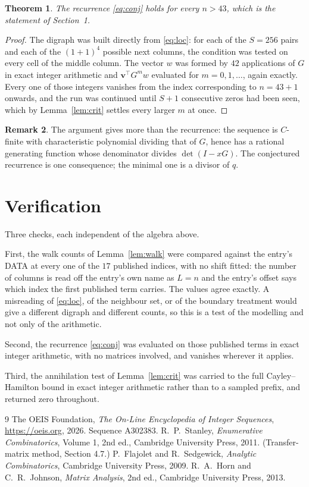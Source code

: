 \documentclass[11pt,a4paper]{article}
\theoremstyle{plain}
\newtheorem{theorem}{Theorem}
\theoremstyle{definition}
\newtheorem{remark}[theorem]{Remark}
\begin{document}
\begin{theorem}
The recurrence \eqref{eq:conj} holds for every $n>43$, which is the statement of
Section~1.
\end{theorem}

\begin{proof}
The digraph was built directly from \eqref{eq:loc}: for each of the $S=256$ pairs and each
of the $(1+1)^{4}$ possible next columns, the condition was tested on every cell of
the middle column. The vector $w$ was formed by $42$ applications of $G$ in exact integer
arithmetic and $\mathbf{v}^{\!\top}G^{m}w$ evaluated for $m=0,1,\dots$, again exactly.
Every one of those integers vanishes from the index corresponding to $n=43+1$ onwards,
and the run was continued until $S+1$ consecutive zeros had been seen, which by
Lemma~\ref{lem:crit} settles every larger $m$ at once.
\end{proof}

\begin{remark}
The argument gives more than the recurrence: the sequence is $C$-finite with characteristic
polynomial dividing that of $G$, hence has a rational generating function whose denominator
divides $\det(I-xG)$. The conjectured recurrence is one consequence; the minimal one is a
divisor of $q$.
\end{remark}

\section{Verification}

Three checks, each independent of the algebra above.

First, the walk counts of Lemma~\ref{lem:walk} were compared against the entry's DATA at
every one of the $17$ published indices, with no shift fitted: the number of columns is
read off the entry's own name as $L=n$ and the entry's offset says which index the first
published term carries. The values agree exactly. A misreading of \eqref{eq:loc}, of the
neighbour set, or of the boundary treatment would give a different digraph and different
counts, so this is a test of the modelling and not only of the arithmetic.

Second, the recurrence \eqref{eq:conj} was evaluated on those published terms in exact
integer arithmetic, with no matrices involved, and vanishes wherever it applies.

Third, the annihilation test of Lemma~\ref{lem:crit} was carried to the full
Cayley--Hamilton bound in exact integer arithmetic rather than to a sampled prefix, and
returned zero throughout.

\begin{thebibliography}{9}
 The OEIS Foundation, \emph{The On-Line Encyclopedia of Integer
Sequences}, \url{https://oeis.org}, 2026. Sequence A302383.
 R.~P.~Stanley, \emph{Enumerative Combinatorics}, Volume 1, 2nd ed.,
Cambridge University Press, 2011. (Transfer-matrix method, Section 4.7.)
 P.~Flajolet and R.~Sedgewick, \emph{Analytic Combinatorics}, Cambridge
University Press, 2009.
 R.~A.~Horn and C.~R.~Johnson, \emph{Matrix Analysis}, 2nd ed., Cambridge
University Press, 2013.
\end{thebibliography}
\end{document}
